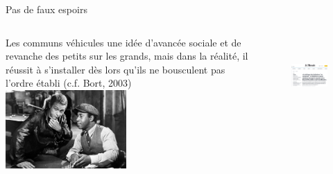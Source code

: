\documentclass[newPxFont]{beamer}
\begin{document}
\begin{frame}[c]{Pas de faux espoirs}
\vspace{-1cm}
\begin{columns}[onlytextwidth,T]
  \column{\dimexpr\linewidth-30mm-5mm}
  \small{Les communs véhicules une idée d'avancée sociale et de revanche des petits sur les grands, mais dans la réalité, il réussit à s'installer dès lors qu'ils ne bousculent pas l'ordre établi (c.f. Bort, 2003)}\\
  \vspace{0.5cm}
  \includegraphics[height=3cm]{img/thecincinnatiKid.jpg}

  \column{35mm}
  \begin{figure}
    \includegraphics[height=3cm]{img/leMonde301023.png}
  \end{figure}

\end{columns}
\end{frame}
\end{document}
